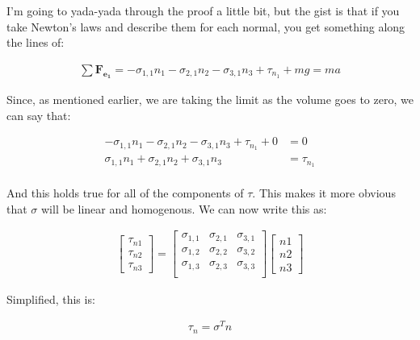 I'm going to yada-yada through the proof a little bit, but the gist is that if you take Newton's laws and describe them for each normal, you get something along the lines of: 

\begin{equation} \label{phenom1}
\begin{split}
\sum \mathbf{F_{e_1}} = -\sigma_{1,1}n_1 - \sigma_{2,1}n_2 - \sigma_{3,1}n_3 + \tau_{n_1} + mg = ma
\end{split}
\end{equation}

Since, as mentioned earlier, we are taking the limit as the volume goes to zero, we can say that: 

\begin{equation} \label{phenom1}
\begin{split}
-\sigma_{1,1}n_1 - \sigma_{2,1}n_2 - \sigma_{3,1}n_3 + \tau_{n_1} + 0 &= 0 \\ 
\sigma_{1,1}n_1 + \sigma_{2,1}n_2 + \sigma_{3,1}n_3 &= \tau_{n_1}  \\ 
\end{split}
\end{equation}

And this holds true for all of the components of $\tau$. This makes it more obvious that $\sigma$ will be linear and homogenous. We can now write this as: 

\begin{align}
\begin{bmatrix} %
\tau_{n1} \\
\tau_{n2} \\
\tau_{n3}
\end{bmatrix}
=
\begin{bmatrix} %
\sigma_{1,1} & \sigma_{2,1} & \sigma_{3,1} \\
\sigma_{1,2} & \sigma_{2,2} & \sigma_{3,2} \\
\sigma_{1,3} & \sigma_{2,3} & \sigma_{3,3} \\
\end{bmatrix}
\begin{bmatrix} %
n1 \\
n2 \\
n3
\end{bmatrix}
\end{align}

Simplified, this is: 

\begin{equation} \label{phenom1}
\begin{split}
\tau_n = \sigma^Tn
\end{split}
\end{equation}

